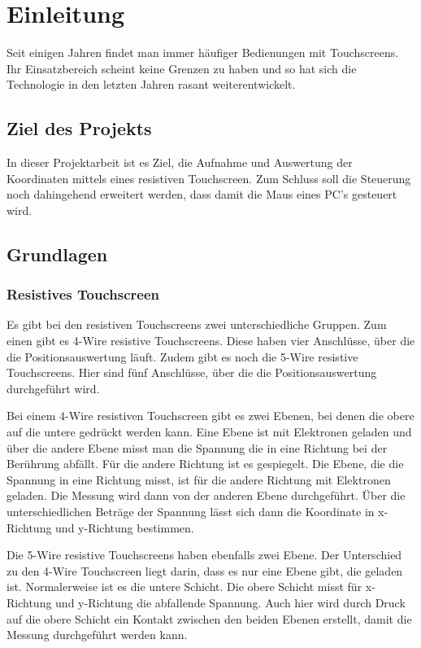\chapter{Einleitung}
Seit einigen Jahren findet man immer häufiger Bedienungen mit Touchscreens.
Ihr Einsatzbereich scheint keine Grenzen zu haben und so hat sich die Technologie in den letzten Jahren rasant weiterentwickelt.


\section{Ziel des Projekts}
In dieser Projektarbeit ist es Ziel, die Aufnahme und Auswertung der Koordinaten mittels eines resistiven Touchscreen.
Zum Schluss soll die Steuerung noch dahingehend erweitert werden, dass damit die Maus eines PC's gesteuert wird.


\section{Grundlagen}
\subsection{Resistives Touchscreen}
Es gibt bei den resistiven Touchscreens zwei unterschiedliche Gruppen.
Zum einen gibt es 4-Wire resistive Touchscreens.
Diese haben vier Anschlüsse, über die die Positionsauswertung läuft.
Zudem gibt es noch die 5-Wire resistive Touchscreens.
Hier sind fünf Anschlüsse, über die die Positionsauswertung durchgeführt wird.

Bei einem 4-Wire resistiven Touchscreen gibt es zwei Ebenen, bei denen die obere auf die untere gedrückt werden kann.
Eine Ebene ist mit Elektronen geladen und über die andere Ebene misst man die Spannung die in eine Richtung bei der Berührung abfällt.
Für die andere Richtung ist es gespiegelt.
Die Ebene, die die Spannung in eine Richtung misst, ist für die andere Richtung mit Elektronen geladen.
Die Messung wird dann von der anderen Ebene durchgeführt.
Über die unterschiedlichen Beträge der Spannung lässt sich dann die Koordinate in x-Richtung und y-Richtung bestimmen.

Die 5-Wire resistive Touchscreens haben ebenfalls zwei Ebene.
Der Unterschied zu den 4-Wire Touchscreen liegt darin, dass es nur eine Ebene gibt, die geladen ist.
Normalerweise ist es die untere Schicht.
Die obere Schicht misst  für x-Richtung und y-Richtung die abfallende Spannung.
Auch hier wird durch Druck auf die obere Schicht ein Kontakt zwischen den beiden Ebenen erstellt, damit die Messung durchgeführt werden kann.

